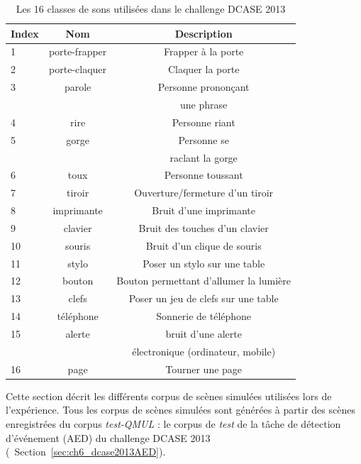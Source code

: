 \begin{table}[t]
\begin{center}
\begin{tabular}{lcc}
\textbf{Index} & \textbf{Nom}  & \textbf{Description}  \\ 
\hline
1   & porte-frapper & Frapper à la porte \\
2   & porte-claquer & Claquer la porte \\
3   & parole        & Personne  prononçant \\
    &               &  une phrase \\
4   & rire          & Personne riant  \\    
5   & gorge         & Personne se   \\
    &               & raclant la gorge \\
6   & toux          & Personne toussant \\
7   & tiroir        & Ouverture/fermeture d'un tiroir \\
8   & imprimante    & Bruit d'une imprimante \\
9   & clavier       & Bruit des touches d'un clavier \\
10  & souris        & Bruit d'un clique de souris \\
11  & stylo         & Poser un stylo sur une table \\
12  & bouton        & Bouton permettant d'allumer la lumière \\
13  & clefs         & Poser un jeu de clefs sur une table \\    
14  & téléphone     & Sonnerie de téléphone \\
15  & alerte        & bruit d'une alerte \\
    &               & électronique  (ordinateur, mobile) \\
16  & page          & Tourner une page \\     
\hline      
\end{tabular}
\end{center}
\label{tab:eventDCASE2013}
\caption{Les 16 classes de sons utilisées dans le challenge DCASE 2013}
\end{table}

Cette section décrit les différents corpus de scènes simulées utilisées lors de l'expérience. Tous les corpus  de scènes simulées sont générées à partir des scènes enregistrées du corpus \emph{test-QMUL} : le corpus de \emph{test} de la tâche de détection d'événement (AED) du challenge DCASE 2013  \citep{giannoulis2013detection} (\cf~Section~\ref{sec:ch6_dcase2013AED}). 

